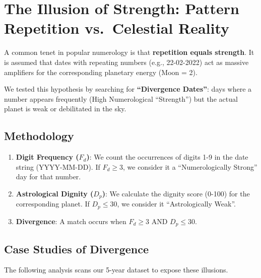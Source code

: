 \documentclass[
  11pt,
  a4paper,
  oneside,
  openany]{article}
\providecommand{\tightlist}{%
  \setlength{\itemsep}{0pt}\setlength{\parskip}{0pt}}\usepackage{longtable,booktabs,array}
\begin{document}
\FloatBarrier

\section{The Illusion of Strength: Pattern Repetition vs.~Celestial
Reality}\label{the-illusion-of-strength-pattern-repetition-vs.-celestial-reality}

A common tenet in popular numerology is that \textbf{repetition equals
strength}. It is assumed that dates with repeating numbers (e.g.,
22-02-2022) act as massive amplifiers for the corresponding planetary
energy (Moon = 2).

We tested this hypothesis by searching for \textbf{``Divergence
Dates''}: days where a number appears frequently (High Numerological
``Strength'') but the actual planet is weak or debilitated in the sky.

\subsection{Methodology}\label{methodology}

\begin{enumerate}
\def\labelenumi{\arabic{enumi}.}
\tightlist
\item
  \textbf{Digit Frequency (\(F_d\))}: We count the occurrences of digits
  1-9 in the date string (YYYY-MM-DD). If \(F_d \ge 3\), we consider it
  a ``Numerologically Strong'' day for that number.
\item
  \textbf{Astrological Dignity (\(D_p\))}: We calculate the dignity
  score (0-100) for the corresponding planet. If \(D_p \le 30\), we
  consider it ``Astrologically Weak''.
\item
  \textbf{Divergence}: A match occurs when \(F_d \ge 3\) AND
  \(D_p \le 30\).
\end{enumerate}

\subsection{Case Studies of
Divergence}\label{case-studies-of-divergence}

The following analysis scans our 5-year dataset to expose these
illusions.
\end{document}
